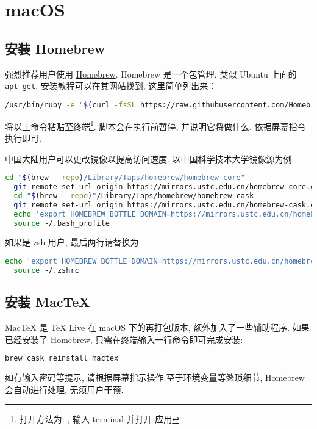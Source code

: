 \chapter{macOS}

\section{安装 Homebrew}

强烈推荐用户使用 \href{https://brew.sh}{Homebrew}. Homebrew 是一个包管理, 类似 Ubuntu 上面的
\texttt{apt-get}. 安装教程可以在其网站找到, 这里简单列出来：
\begin{lstlisting}[language=bash]
  /usr/bin/ruby -e "$(curl -fsSL https://raw.githubusercontent.com/Homebrew/install/master/install)"
\end{lstlisting}
将以上命令粘贴至终端\footnote{打开方法为: \keys{\cmdmac + \SPACE}, 输入 terminal 并打开  应用}.
脚本会在执行前暂停, 并说明它将做什么. 依据屏幕指令执行即可.

中国大陆用户可以更改镜像以提高访问速度. 以中国科学技术大学镜像源为例:
\begin{lstlisting}[language=bash]
  cd "$(brew --repo)/Library/Taps/homebrew/homebrew-core"
  git remote set-url origin https://mirrors.ustc.edu.cn/homebrew-core.git
  cd "$(brew --repo)"/Library/Taps/homebrew/homebrew-cask
  git remote set-url origin https://mirrors.ustc.edu.cn/homebrew-cask.git
  echo 'export HOMEBREW_BOTTLE_DOMAIN=https://mirrors.ustc.edu.cn/homebrew-bottles' >> ~/.bash_profile
  source ~/.bash_profile
\end{lstlisting}
如果是 zsh 用户, 最后两行请替换为
\begin{lstlisting}[language=bash]
  echo 'export HOMEBREW_BOTTLE_DOMAIN=https://mirrors.ustc.edu.cn/homebrew-bottles' >> ~/.zshrc
  source ~/.zshrc
\end{lstlisting}

\section{安装 Mac\TeX}

Mac\TeX{} 是 \TeX{} Live 在 macOS 下的再打包版本, 额外加入了一些辅助程序. 如果已经安装了 Homebrew,
只需在终端输入一行命令即可完成安装:
\begin{lstlisting}[language=bash]
  brew cask reinstall mactex
\end{lstlisting}
如有输入密码等提示, 请根据屏幕指示操作.至于环境变量等繁琐细节, Homebrew 会自动进行处理,
无须用户干预.

